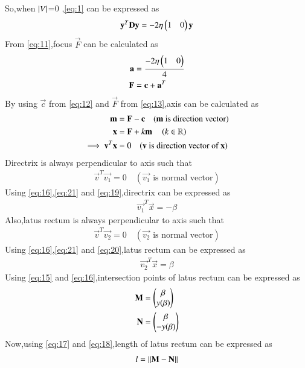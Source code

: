 \documentclass[journal,12pt,twocolumn]{IEEEtran}
\begin{document}
So,when $\left\vert V\right\vert$=0 ,\eqref{eq:1} can be expressed as 
\begin{align}
\mathbf{y}^T\mathbf{D}\mathbf{y} = -2\eta\begin{pmatrix}1 & 0\end{pmatrix}\mathbf{y} \label{eq:11}
\end{align}
From \eqref{eq:11},focus $\vec{F}$ can be calculated as
\begin{align}
\mathbf{a} &= \frac{-2\eta\begin{pmatrix}1 & 0\end{pmatrix}}{4} 
\\
\mathbf{F} &= \mathbf{c} + \mathbf{a}^T  \label{eq:13}
\end{align}
By using $\vec{c}$ from \eqref{eq:12} and $\vec{F}$ from \eqref{eq:13},axis can be calculated as
\begin{align}
\mathbf{m} &= \mathbf{F}-\mathbf{c} \quad (\text{$\mathbf{m}$ is direction vector})
\\
\mathbf{x} &= \mathbf{F}+k\mathbf{m} \quad \left(k \in \mathbb{R}\right) \label{eq:14}
\\
\implies \mathbf{v}^T\mathbf{x} &= 0 \quad (\text{$\mathbf{v}$ is direction vector of $\mathbf{x}$}) \label{eq:21}
\end{align}
Directrix is always perpendicular to axis such that 
\begin{align}
\vec{v}^T\vec{v_1} = 0 \quad (\text{$\vec{v_1}$ is normal vector}) \label{eq:19}
\end{align}
Using \eqref{eq:16},\eqref{eq:21} and \eqref{eq:19},directrix can be expressed as 
\begin{align}
    \vec{v_1}^T\vec{x} = -\beta 
\end{align}
Also,latus rectum is always perpendicular to axis such that
\begin{align}
    \vec{v}^T\vec{v_2} = 0 \quad (\text{$\vec{v_2}$ is normal vector}) \label{eq:20}
\end{align}
Using \eqref{eq:16},\eqref{eq:21} and \eqref{eq:20},latus rectum can be expressed as \begin{align}
    \vec{v_2}^T\vec{x} = \beta 
\end{align}
Using \eqref{eq:15} and \eqref{eq:16},intersection points of latus rectum can be expressed as 
\begin{align}
    \mathbf{M}&=\begin{pmatrix}\beta \\ y(\beta)\end{pmatrix} \label{eq:17}
    \\
    \mathbf{N}&=\begin{pmatrix}\beta \\ -y(\beta)\end{pmatrix} \label{eq:18}
\end{align}
Now,using \eqref{eq:17} and \eqref{eq:18},length of latus rectum can be expressed as
\begin{align}
    l=\left\lVert\mathbf{M}-\mathbf{N}\right\rVert
\end{align}
\end{document}
